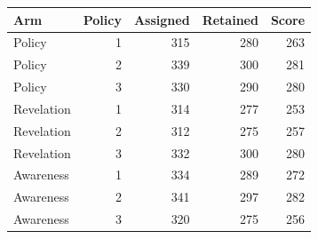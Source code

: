 \begin{tabular}{@{}lrrrr@{}}
\toprule
Arm & Policy & Assigned & Retained & Score \\
\midrule
Policy & 1 & 315 & 280 & 263 \\
Policy & 2 & 339 & 300 & 281 \\
Policy & 3 & 330 & 290 & 280 \\
Revelation & 1 & 314 & 277 & 253 \\
Revelation & 2 & 312 & 275 & 257 \\
Revelation & 3 & 332 & 300 & 280 \\
Awareness & 1 & 334 & 289 & 272 \\
Awareness & 2 & 341 & 297 & 282 \\
Awareness & 3 & 320 & 275 & 256 \\
\bottomrule
\end{tabular}
